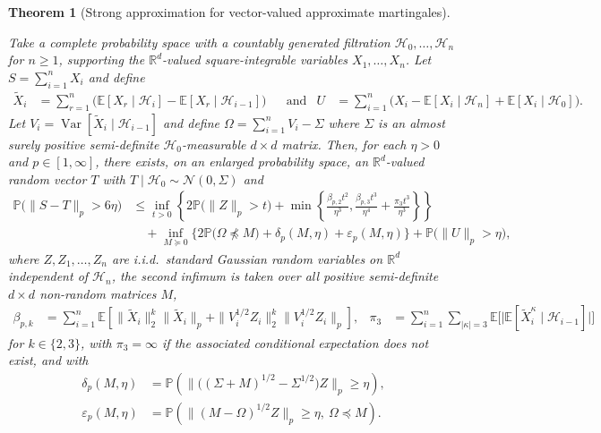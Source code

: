 \documentclass[11pt,lof]{puthesis}
\renewcommand{\P}{\ensuremath{\mathbb{P}}}
\newcommand{\R}{\ensuremath{\mathbb{R}}}
\newcommand{\E}{\ensuremath{\mathbb{E}}}
\newcommand{\cH}{\ensuremath{\mathcal{H}}}
\newcommand{\cN}{\ensuremath{\mathcal{N}}}
\DeclareMathOperator{\Var}{Var}
\theoremstyle{break}
\newtheorem{theorem}{Theorem}[section]
\theoremstyle{proof}
\begin{document}
\begin{theorem}[Strong approximation for vector-valued approximate martingales]
\label{thm:yurinskii_sa_dependent}

Take a complete probability space with a countably generated filtration
$\cH_0, \ldots, \cH_n$ for $n \geq 1$, supporting the $\R^d$-valued
square-integrable variables $X_1, \ldots, X_n$.
Let $S = \sum_{i=1}^n X_i$ and define
%
\begin{align*}
\tilde X_i
&= \sum_{r=1}^n \big(\E[X_{r} \mid \cH_{i}] - \E[X_{r} \mid \cH_{i-1}]\big)
& &\text{and}
&U &= \sum_{i=1}^{n} \big( X_i - \E[ X_i \mid \cH_n]
+ \E[ X_i \mid \cH_0 ] \big).
\end{align*}
%
Let $V_i = \Var[\tilde X_i \mid \cH_{i-1}]$ and
define $\Omega = \sum_{i=1}^n V_i - \Sigma$
where $\Sigma$ is an almost surely positive semi-definite $\cH_0$-measurable
$d \times d$ matrix. Then, for each $\eta > 0$ and $p \in [1,\infty]$,
there exists, on an enlarged probability space, an $\R^d$-valued random
vector $T$ with $T \mid \cH_0 \sim \cN(0, \Sigma)$ and
%
\begin{align}
\label{eq:yurinskii_sa_dependent}
\P\big(\|S-T\|_p > 6\eta\big)
&\leq
\inf_{t>0}
\left\{
2 \P\big( \|Z\|_p > t \big)
+ \min\left\{
\frac{\beta_{p,2} t^2}{\eta^3},
\frac{\beta_{p,3} t^3}{\eta^4}
+ \frac{\pi_3 t^3}{\eta^3}
\right\}
\right\} \nonumber \\
&\quad+
\inf_{M \succeq 0}
\Big\{ 2 \P\big(\Omega \npreceq M\big) + \delta_p(M,\eta)
+ \varepsilon_p(M, \eta)\Big\}
+\P\big(\|U\|_p>\eta\big),
\end{align}
%
where $Z, Z_1,\dots ,Z_n$ are i.i.d.\ standard Gaussian random variables on
$\R^d$ independent of $\cH_n$, the second infimum is taken over all positive
semi-definite $d \times d$ non-random matrices $M$,
%
\begin{align*}
\beta_{p,k}
&=
\sum_{i=1}^n \E\left[\| \tilde X_i \|^k_2 \| \tilde X_i \|_p
+ \|V_i^{1/2} Z_i \|^k_2 \|V_i^{1/2} Z_i \|_p \right],
&\pi_3
&=
\sum_{i=1}^{n}
\sum_{|\kappa| = 3}
\E \Big[ \big|
\E [ \tilde X_i^\kappa \mid \cH_{i-1} ]
\big| \Big]
\end{align*}
%
for $k \in \{2, 3\}$, with $\pi_3 = \infty$ if the associated
conditional expectation does not exist, and with
%
\begin{align*}
\delta_p(M,\eta)
&=
\P\left(
\big\|\big((\Sigma +M)^{1/2}- \Sigma^{1/2}\big) Z\big\|_p
\geq \eta
\right), \\
\varepsilon_p(M, \eta)
&=
\P\left(\big\| (M - \Omega)^{1/2} Z \big\|_p\geq \eta, \
\Omega \preceq M\right).
\end{align*}
\end{theorem}
\end{document}
